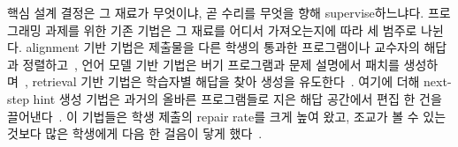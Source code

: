 \documentclass[10pt,conference]{IEEEtran}
\begin{document}
핵심 설계 결정은 그 재료가 무엇이냐, 곧 수리를 무엇을 향해 supervise하느냐다. 프로그래밍 과제를 위한 기존 기법은 그 재료를 어디서 가져오는지에 따라 세 범주로 나뉜다. alignment 기반 기법은 제출물을 다른 학생의 통과한 프로그램이나 교수자의 해답과 정렬하고~\cite{gulwani2018automated,wang2018search,hu2019re,heo2023referent,choi2021automated,choi2025automated}, 언어 모델 기반 기법은 버기 프로그램과 문제 설명에서 패치를 생성하며~\cite{joshi2023repair,zhang2024pydex,phung2023generating,liu2024fastfixer,yang2024cref,zhao2026peer,orvalho2025counterexample}, retrieval 기반 기법은 학습자별 해답을 찾아 생성을 유도한다~\cite{dai2026learner}. 여기에 더해 next-step hint 생성 기법은 과거의 올바른 프로그램들로 지은 해답 공간에서 편집 한 건을 끌어낸다~\cite{piech2015embeddings,rivers2017data,price2017isnap,roest2024next}. 이 기법들은 학생 제출의 repair rate를 크게 높여 왔고, 조교가 볼 수 있는 것보다 많은 학생에게 다음 한 걸음이 닿게 했다~\cite{keuning2018systematic,koutcheme2024benchmarking}.
\end{document}
